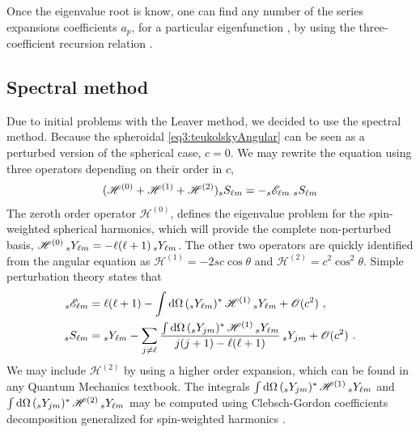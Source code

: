 Once the eigenvalue root is know, one can find any number of the series expansions coefficients $a_p$, for a particular eigenfunction , by using the three-coefficient recursion relation .


\subsection{Spectral method}

Due to initial problems with the Leaver method, we decided to use the spectral method.
Because the spheroidal \eqref{eq3:teukolskyAngular} can be seen as a perturbed version of the spherical case, $c=0$.
We may rewrite the equation using three operators depending on their order in $c$, 
\begin{align}
	\label{eq4:angularEqH012}
	( \mathscr{H}^{(0)} +  \mathscr{H}^{(1)} + \mathscr{H}^{(2)} ) \uu[s]{S}{\ell m} = - \uu[s]{\mathscr{E}}{\ell m}  \;\uu[s]{S}{\ell m} 
\end{align}
The zeroth order operator $\mathscr{H}^{(0)}$, defines the eigenvalue problem for the spin-weighted spherical harmonics, which will provide the complete non-perturbed basis, $\mathscr{H}^{(0)} \,\uu[s]{Y}{\ell m} = -\ell(\ell+1) \,\uu[s]{Y}{\ell m}$.
The other two operators are quickly identified from the angular equation as $\mathscr{H}^{(1)} = - 2 s c \cos\theta$ and $\mathscr{H}^{(2)} = c^2 \cos^2\theta$.
Simple perturbation theory states that
\begin{align}
	\begin{split}
		\uu[s]{\mathscr{E}}{\ell m} &= \ell(\ell+1) - \int \dd\Omega \,(\uu[s]{Y}{\ell m})^* \,\mathscr{H}^{(1)} \,\uu[s]{Y}{\ell m} + \mathscr{O}(c^2) ~, \\
		\uu[s]{S}{\ell m} &= \uu[s]{Y}{\ell m} - \sum_{j\ne\ell} \frac{\int \dd\Omega \,(\uu[s]{Y}{j m})^* \,\mathscr{H}^{(1)} \,\uu[s]{Y}{\ell m}}{j(j+1)-\ell(\ell+1)} \, \uu[s]{Y}{j m} +\mathscr{O}(c^2) ~.
	\end{split}
\end{align}
We may include $\mathscr{H}^{(2)}$ by using a higher order expansion, which can be found in any Quantum Mechanics textbook.
The integrals $\int \dd\Omega \,(\uu[s]{Y}{j m})^* \,\mathscr{H}^{(1)} \,\uu[s]{Y}{\ell m}$ and $\int \dd\Omega \,(\uu[s]{Y}{j m})^* \,\mathscr{H}^{(2)} \,\uu[s]{Y}{\ell m}$ may be computed using Clebsch-Gordon coefficients decomposition generalized for spin-weighted harmonics .
